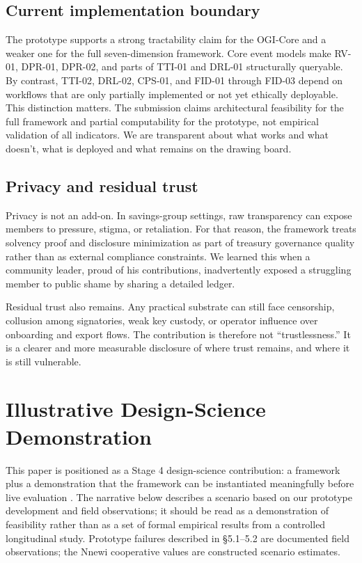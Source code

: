 \documentclass[sigconf,anonymous]{acmart}
\begin{document}
\subsection{Current implementation boundary}

The prototype supports a strong tractability claim for the OGI-Core and a weaker one for the full seven-dimension framework. Core event models make RV-01, DPR-01, DPR-02, and parts of TTI-01 and DRL-01 structurally queryable. By contrast, TTI-02, DRL-02, CPS-01, and FID-01 through FID-03 depend on workflows that are only partially implemented or not yet ethically deployable. This distinction matters. The submission claims architectural feasibility for the full framework and partial computability for the prototype, not empirical validation of all indicators. We are transparent about what works and what doesn’t, what is deployed and what remains on the drawing board.

\subsection{Privacy and residual trust}

Privacy is not an add-on. In savings-group settings, raw transparency can expose members to pressure, stigma, or retaliation. For that reason, the framework treats solvency proof and disclosure minimization as part of treasury governance quality rather than as external compliance constraints. We learned this when a community leader, proud of his contributions, inadvertently exposed a struggling member to public shame by sharing a detailed ledger.

Residual trust also remains. Any practical substrate can still face censorship, collusion among signatories, weak key custody, or operator influence over onboarding and export flows. The contribution is therefore not “trustlessness.” It is a clearer and more measurable disclosure of where trust remains, and where it is still vulnerable.

\section{Illustrative Design-Science Demonstration}


This paper is positioned as a Stage 4 design-science contribution: a framework plus a demonstration that the framework can be instantiated meaningfully before live evaluation \cite{hevner2004, peffers2007, dresch2015}. The narrative below describes a scenario based on our prototype development and field observations; it should be read as a demonstration of feasibility rather than as a set of formal empirical results from a controlled longitudinal study. Prototype failures described in §5.1–5.2 are documented field observations; the Nnewi cooperative values are constructed scenario estimates.
\end{document}

